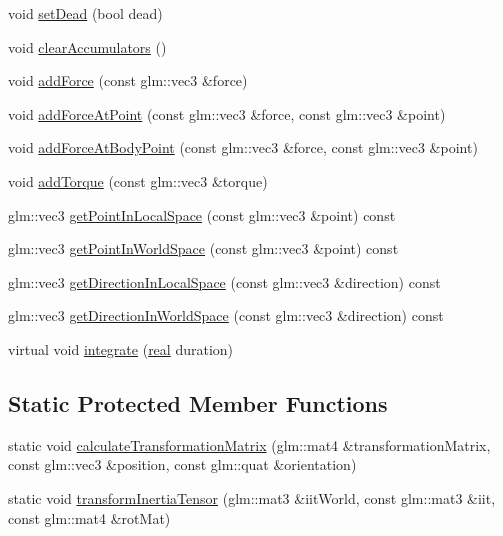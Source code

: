 \begin{DoxyCompactItemize}
\item 
void \mbox{\hyperlink{classrum_1_1_rigid_body_a54f9d7a3a62ce43ebb01b4e0b3734481}{set\+Dead}} (bool dead)
\item 
void \mbox{\hyperlink{classrum_1_1_rigid_body_ae6048d852853ae37ebc9301b430ad021}{clear\+Accumulators}} ()
\item 
void \mbox{\hyperlink{classrum_1_1_rigid_body_a82678048704e31e6781d107c89094706}{add\+Force}} (const glm\+::vec3 \&force)
\item 
void \mbox{\hyperlink{classrum_1_1_rigid_body_a8bfbbe5f4c71e6e3d484479bcbf98b8e}{add\+Force\+At\+Point}} (const glm\+::vec3 \&force, const glm\+::vec3 \&point)
\item 
void \mbox{\hyperlink{classrum_1_1_rigid_body_a5025fc4cc7be3202b84485ae2fdfdcf7}{add\+Force\+At\+Body\+Point}} (const glm\+::vec3 \&force, const glm\+::vec3 \&point)
\item 
void \mbox{\hyperlink{classrum_1_1_rigid_body_aaaf225465b2beb2e1d5737adb17a1421}{add\+Torque}} (const glm\+::vec3 \&torque)
\item 
glm\+::vec3 \mbox{\hyperlink{classrum_1_1_rigid_body_a4aff0a01d641859d37f87126d15ec277}{get\+Point\+In\+Local\+Space}} (const glm\+::vec3 \&point) const
\item 
glm\+::vec3 \mbox{\hyperlink{classrum_1_1_rigid_body_a6c47248ece653cb70c2bf5e785d3d13c}{get\+Point\+In\+World\+Space}} (const glm\+::vec3 \&point) const
\item 
glm\+::vec3 \mbox{\hyperlink{classrum_1_1_rigid_body_a7904a2e04f4b5b491b1ac092474a96ec}{get\+Direction\+In\+Local\+Space}} (const glm\+::vec3 \&direction) const
\item 
glm\+::vec3 \mbox{\hyperlink{classrum_1_1_rigid_body_a5b6261b8cc054b044219f976d2b9d5e3}{get\+Direction\+In\+World\+Space}} (const glm\+::vec3 \&direction) const
\item 
virtual void \mbox{\hyperlink{classrum_1_1_rigid_body_a3f9e7cf532fc67b639b489a3875b08fd}{integrate}} (\mbox{\hyperlink{namespacerum_a7e8cca23573d5eaead0f138cbaa4862c}{real}} duration)
\end{DoxyCompactItemize}
\subsection*{Static Protected Member Functions}
\begin{DoxyCompactItemize}
\item 
static void \mbox{\hyperlink{classrum_1_1_rigid_body_a14e0125fad626f899e31e2aa4a4c7a71}{calculate\+Transformation\+Matrix}} (glm\+::mat4 \&transformation\+Matrix, const glm\+::vec3 \&position, const glm\+::quat \&orientation)
\item 
static void \mbox{\hyperlink{classrum_1_1_rigid_body_aacbc5d4d598578ebe4624dd5b10d1253}{transform\+Inertia\+Tensor}} (glm\+::mat3 \&iit\+World, const glm\+::mat3 \&iit, const glm\+::mat4 \&rot\+Mat)
\end{DoxyCompactItemize}
